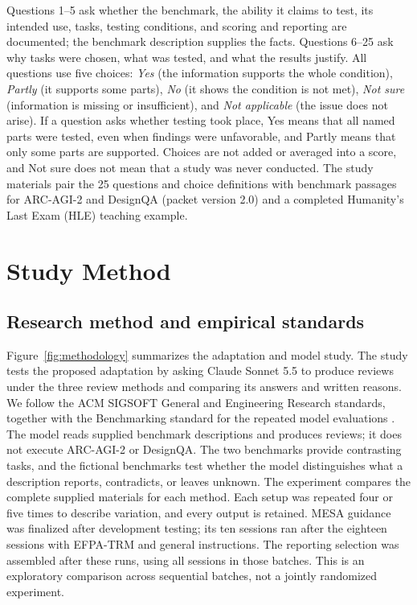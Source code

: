 \documentclass[10pt,conference]{IEEEtran}
\begin{document}
Questions 1--5 ask whether the benchmark, the ability it claims to test, its intended use, tasks, testing conditions, and scoring and reporting are documented; the benchmark description supplies the facts. Questions 6--25 ask why tasks were chosen, what was tested, and what the results justify. All questions use five choices: \emph{Yes} (the information supports the whole condition), \emph{Partly} (it supports some parts), \emph{No} (it shows the condition is not met), \emph{Not sure} (information is missing or insufficient), and \emph{Not applicable} (the issue does not arise). If a question asks whether testing took place, Yes means that all named parts were tested, even when findings were unfavorable, and Partly means that only some parts are supported. Choices are not added or averaged into a score, and Not sure does not mean that a study was never conducted. The study materials pair the 25 questions and choice definitions with benchmark passages for ARC-AGI-2 and DesignQA (packet version 2.0) and a completed Humanity's Last Exam (HLE) teaching example.

\section{Study Method}
\subsection{Research method and empirical standards}
Figure~\ref{fig:methodology} summarizes the adaptation and model study. The study tests the proposed adaptation by asking Claude Sonnet 5.5 to produce reviews under the three review methods and comparing its answers and written reasons. We follow the ACM SIGSOFT General and Engineering Research standards, together with the Benchmarking standard for the repeated model evaluations \cite{sigsoft_empirical_standards}. The model reads supplied benchmark descriptions and produces reviews; it does not execute ARC-AGI-2 or DesignQA. The two benchmarks provide contrasting tasks, and the fictional benchmarks test whether the model distinguishes what a description reports, contradicts, or leaves unknown. The experiment compares the complete supplied materials for each method. Each setup was repeated four or five times to describe variation, and every output is retained. MESA guidance was finalized after development testing; its ten sessions ran after the eighteen sessions with EFPA-TRM and general instructions. The reporting selection was assembled after these runs, using all sessions in those batches. This is an exploratory comparison across sequential batches, not a jointly randomized experiment.
\end{document}
